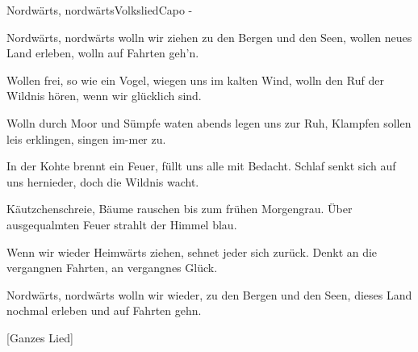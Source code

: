 \begin{song}{Nordwärts, nordwärts}{Volkslied}{Capo -}

Nordwärts, nordwärts wolln wir ziehen zu den Bergen und den Seen,
wollen neues Land erleben, wolln auf Fahrten geh'n.

Wollen frei, so wie ein Vogel, wiegen uns im kalten Wind,
wolln den Ruf der Wildnis hören, wenn wir glücklich sind.

Wolln durch Moor und Sümpfe waten abends legen uns zur Ruh,
Klampfen sollen leis erklingen, singen im-mer zu.

In der Kohte brennt ein Feuer, füllt uns alle mit Bedacht.
Schlaf senkt sich auf uns hernieder, doch die Wildnis wacht.

Käutzchenschreie, Bäume rauschen bis zum frühen Morgengrau.
Über ausgequalmten Feuer strahlt der Himmel blau.

Wenn wir wieder Heimwärts ziehen, sehnet jeder sich zurück.
Denkt an die vergangnen Fahrten, an vergangnes Glück.

Nordwärts, nordwärts wolln wir wieder, zu den Bergen und den Seen,
dieses Land nochmal erleben und auf Fahrten gehn.









[Ganzes Lied]
\end{song}
